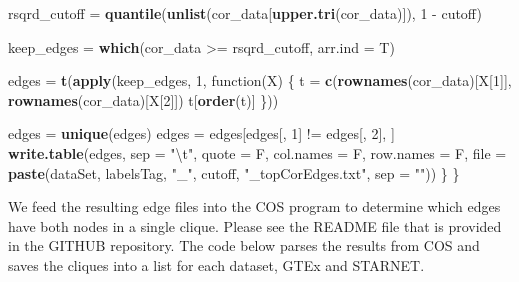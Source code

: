 \documentclass[]{article}
\newenvironment{Shaded}{\begin{snugshade}}{\end{snugshade}}
\newcommand{\KeywordTok}[1]{\textcolor[rgb]{0.13,0.29,0.53}{\textbf{{#1}}}}
\newcommand{\DataTypeTok}[1]{\textcolor[rgb]{0.13,0.29,0.53}{{#1}}}
\newcommand{\DecValTok}[1]{\textcolor[rgb]{0.00,0.00,0.81}{{#1}}}
\newcommand{\CharTok}[1]{\textcolor[rgb]{0.31,0.60,0.02}{{#1}}}
\newcommand{\StringTok}[1]{\textcolor[rgb]{0.31,0.60,0.02}{{#1}}}
\newcommand{\NormalTok}[1]{{#1}}
\begin{document}
\begin{Shaded}
\begin{Highlighting}[]
        \NormalTok{rsqrd_cutoff =}\StringTok{ }\KeywordTok{quantile}\NormalTok{(}\KeywordTok{unlist}\NormalTok{(cor_data[}\KeywordTok{upper.tri}\NormalTok{(cor_data)]), }
            \DecValTok{1} \NormalTok{-}\StringTok{ }\NormalTok{cutoff)}
        
        \NormalTok{keep_edges =}\StringTok{ }\KeywordTok{which}\NormalTok{(cor_data >=}\StringTok{ }\NormalTok{rsqrd_cutoff, }\DataTypeTok{arr.ind =} \NormalTok{T)}
        
        \NormalTok{edges =}\StringTok{ }\KeywordTok{t}\NormalTok{(}\KeywordTok{apply}\NormalTok{(keep_edges, }\DecValTok{1}\NormalTok{, function(X) \{}
            \NormalTok{t =}\StringTok{ }\KeywordTok{c}\NormalTok{(}\KeywordTok{rownames}\NormalTok{(cor_data)[X[}\DecValTok{1}\NormalTok{]], }\KeywordTok{rownames}\NormalTok{(cor_data)[X[}\DecValTok{2}\NormalTok{]])}
            \NormalTok{t[}\KeywordTok{order}\NormalTok{(t)]}
        \NormalTok{\}))}
        
        \NormalTok{edges =}\StringTok{ }\KeywordTok{unique}\NormalTok{(edges)}
        \NormalTok{edges =}\StringTok{ }\NormalTok{edges[edges[, }\DecValTok{1}\NormalTok{] !=}\StringTok{ }\NormalTok{edges[, }\DecValTok{2}\NormalTok{], ]}
        \KeywordTok{write.table}\NormalTok{(edges, }\DataTypeTok{sep =} \StringTok{"}\CharTok{\textbackslash{}t}\StringTok{"}\NormalTok{, }\DataTypeTok{quote =} \NormalTok{F, }\DataTypeTok{col.names =} \NormalTok{F, }
            \DataTypeTok{row.names =} \NormalTok{F, }\DataTypeTok{file =} \KeywordTok{paste}\NormalTok{(dataSet, labelsTag, }\StringTok{"_"}\NormalTok{, }
                \NormalTok{cutoff, }\StringTok{"_topCorEdges.txt"}\NormalTok{, }\DataTypeTok{sep =} \StringTok{""}\NormalTok{))}
    \NormalTok{\}}
\NormalTok{\}}
\end{Highlighting}
\end{Shaded}

We feed the resulting edge files into the COS program to determine which
edges have both nodes in a single clique. Please see the README file
that is provided in the GITHUB repository. The code below parses the
results from COS and saves the cliques into a list for each dataset,
GTEx and STARNET.
\end{document}
